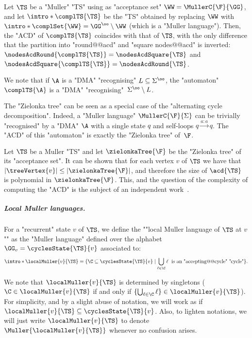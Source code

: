 \documentclass[10pt,a4paper]{amsart}
\renewcommand{\gg}{\gamma}
\renewcommand{\SS}{\Sigma}
\newcommand{\re}[1]{\xrightarrow{#1}}
\begin{document}
\begin{remark}\label{rmk-acd:complementation-ACD}
	Let $\TS$ be a "Muller" "TS" using as "acceptance set" $\WW = \MullerC{\F}{\GG}$, and let $\intro*\complTS{\TS}$ be the "TS" obtained by replacing $\WW$ with $\intro*\complSet{\WW} = \GG^\oo \setminus \WW$ (which is a "Muller language"). Then, the "ACD" of $\complTS{\TS}$ coincides with that of $\TS$, with the only difference that the partition into "round@@acd" and "square nodes@@acd" is inverted: $\nodesAcdRound{\complTS{\TS}} = \nodesAcdSquare{\TS}$ and $\nodesAcdSquare{\complTS{\TS}} = \nodesAcdRound{\TS}$.
	
	We note that if $\A$ is a "DMA" "recognising" $L\subseteq \SS^\oo$, the "automaton" $\complTS{\A}$ is a "DMA" "recognising"~$\SS^\oo\setminus L$.
\end{remark}

\begin{remark}\label{rmk-acd:ZT-as-ACD}
	The "Zielonka tree" can be seen as a special case of the "alternating cycle decomposition". Indeed, a "Muller language" $\MullerC{\F}{\SS}$ can be trivially "recognised" by a "DMA" $\A$ with a single state $q$ and self-loops $q\re{a:a}q$. The "ACD" of this "automaton" is exactly the "Zielonka tree" of~$\F$.
\end{remark}

\begin{remark}
    Let $\TS$ be a Muller "TS" and let $\zielonkaTree{\F}$ be the "Zielonka tree" of its "acceptance set". It can be shown that for each vertex $v$ of $\TS$ we have that $|\treeVertex{v}| \leq |\zielonkaTree{\F}|$, and therefore the size of $\acd{\TS}$ is polynomial in $\zielonkaTree{\F}$. 
    This, and the question of the complexity of computing the "ACD" is the subject of an independent work~\cite{CM24Simplifying}.
\end{remark}

\subparagraph{Local Muller languages.}\label{subsect-prelim:local-Muller}
\AP For a "recurrent" state $v$ of $\TS$, we define the ""local Muller language of $\TS$ at $v$"" as the "Muller language" defined over the alphabet $\GG_v = \cyclesState{\TS}{v}$ associated to:
\[ \intro*\localMuller{v}{\TS} = \{ \C \subseteq \cyclesState{\TS}{v} \mid \bigcup_{\ell\in \C} \ell \; \text{ is an "accepting@@cycle" "cycle"}\}. \] 

We note that $\localMuller{v}{\TS}$ is determined by singletons ($\C \in \localMuller{v}{\TS}$ if and only if $\{\bigcup_{\ell \in \C}\ell\} \in \localMuller{v}{\TS}$). For simplicity, and by a slight abuse of notation, we will work as if $\localMuller{v}{\TS} \subseteq \cyclesState{\TS}{v}$.
Also, to lighten notations, we will just write $\localMuller{v}{\TS}$ to denote $\Muller{\localMuller{v}{\TS}}$ whenever no confusion arises.
\end{document}
